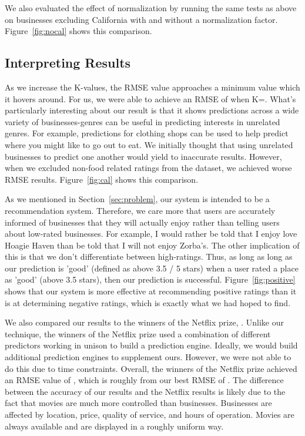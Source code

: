 
We also evaluated the effect of normalization by running the same tests as
above on businesses excluding California with and without a normalization
factor. Figure~\ref{fig:nocal} shows this comparison.

\subsection{Interpreting Results}
As we increase the K-values, the RMSE value approaches a minimum value which it
hovers around. For us, we were able to achieve an RMSE of \bestRMSE when
K=\bestK.
What's particularly interesting about our result is that it shows predictions
across a wide variety of businesses-genres can be useful in predicting
interests in unrelated genres. For example, predictions for clothing shops can
be used to help predict where you might like to go out to eat. We initially
thought that using unrelated businesses to predict one another would yield to
inaccurate results. However, when we excluded non-food related ratings from the
dataset, we achieved worse RMSE results. Figure~\ref{fig:cal} shows this comparison.

As we mentioned in Section~\ref{sec:problem}, our system is intended to be a recommendation system. 
Therefore, we care more that users are accurately informed of businesses that they will actually enjoy rather than
telling users about low-rated businesses. For example, I would rather be told that I enjoy love Hoagie Haven than be told
that I will not enjoy Zorba's. The other implication of this is that we don't differentiate between high-ratings. Thus, as long
as long as our prediction is 'good' (defined as above 3.5 / 5 stars) when a user rated a place as 'good' (above 3.5 stars), then 
our prediction is successful.  Figure~\ref{fig:positive} shows that our system is more effective at recommending positive ratings
than it is at determining negative ratings, which is exactly what we had hoped to find. 

We also compared our results to the winners of the Netflix prize,
\cite{netprize}. Unlike our technique, the winners of the Netflix prize used a
combination of different predictors working in unison to build a prediction
engine. Ideally, we would build additional prediction engines to supplement
ours. However, we were not able to do this due to time constraints. Overall,
the winners of the Netflix prize achieved an RMSE value of \bestNetflixRMSEnsp,
which is roughly \netDiff from our best RMSE of \bestRMSEnsp. The difference
between the accuracy of our results and the Netflix results is likely due to
the fact that movies are much more controlled than businesses. Businesses are
affected by location, price, quality of service, and hours of operation. Movies
are always available and are displayed in a roughly uniform way. 


